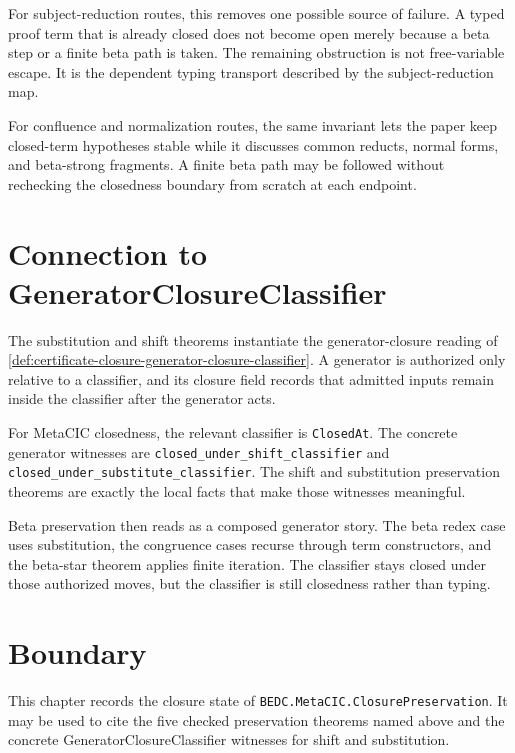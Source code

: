 For subject-reduction routes, this removes one possible source of failure. A
typed proof term that is already closed does not become open merely because a
beta step or a finite beta path is taken. The remaining obstruction is not
free-variable escape. It is the dependent typing transport described by the
subject-reduction map.

For confluence and normalization routes, the same invariant lets the paper
keep closed-term hypotheses stable while it discusses common reducts, normal
forms, and beta-strong fragments. A finite beta path may be followed without
rechecking the closedness boundary from scratch at each endpoint.

\section{Connection to GeneratorClosureClassifier}
\label{sec:metacic-closure-preservation-audit-map-generator-classifier}

The substitution and shift theorems instantiate the generator-closure reading
of \autoref{def:certificate-closure-generator-closure-classifier}. A generator
is authorized only relative to a classifier, and its closure field records
that admitted inputs remain inside the classifier after the generator acts.

For MetaCIC closedness, the relevant classifier is \texttt{ClosedAt}. The
concrete generator witnesses are
\texttt{closed\_under\_shift\_classifier} and
\texttt{closed\_under\_substitute\_classifier}. The shift
and substitution preservation theorems are exactly the local facts that make
those witnesses meaningful.

Beta preservation then reads as a composed generator story. The beta redex
case uses substitution, the congruence cases recurse through term
constructors, and the beta-star theorem applies finite iteration. The
classifier stays closed under those authorized moves, but the classifier is
still closedness rather than typing.

\section{Boundary}
\label{sec:metacic-closure-preservation-audit-map-boundary}

This chapter records the closure state of
\texttt{BEDC.MetaCIC.ClosurePreservation}. It may be used to cite the five
checked preservation theorems named above and the concrete
GeneratorClosureClassifier witnesses for shift and substitution.

